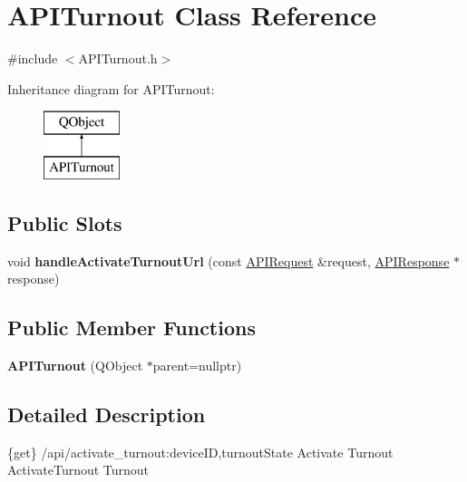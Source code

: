 \hypertarget{class_a_p_i_turnout}{}\section{A\+P\+I\+Turnout Class Reference}
\label{class_a_p_i_turnout}


{\ttfamily \#include $<$A\+P\+I\+Turnout.\+h$>$}

Inheritance diagram for A\+P\+I\+Turnout\+:\begin{figure}[H]
\begin{center}
\leavevmode
\includegraphics[height=2.000000cm]{class_a_p_i_turnout}
\end{center}
\end{figure}
\subsection*{Public Slots}
\begin{DoxyCompactItemize}
\item 
\mbox{\label{class_a_p_i_turnout_a56cef33f12b9d8c13aa8cdce7e24bf0c}} 
void {\bfseries handle\+Activate\+Turnout\+Url} (const \hyperlink{class_a_p_i_request}{A\+P\+I\+Request} \&request, \hyperlink{class_a_p_i_response}{A\+P\+I\+Response} $\ast$response)
\end{DoxyCompactItemize}
\subsection*{Public Member Functions}
\begin{DoxyCompactItemize}
\item 
\mbox{\label{class_a_p_i_turnout_a6c730f3cc2cee54be17e110770b9070b}} 
{\bfseries A\+P\+I\+Turnout} (Q\+Object $\ast$parent=nullptr)
\end{DoxyCompactItemize}


\subsection{Detailed Description}
\{get\} /api/activate\+\_\+turnout\+:device\+ID,turnout\+State Activate Turnout  Activate\+Turnout  Turnout

